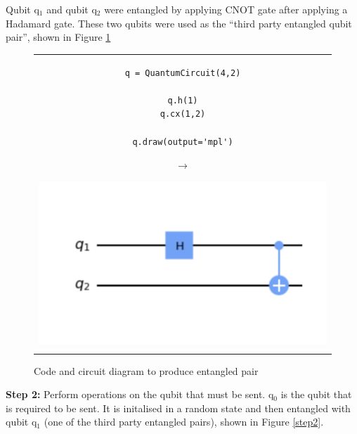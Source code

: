 Qubit q$_1$ and qubit q$_2$ were entangled by applying CNOT gate after applying a Hadamard gate. These two qubits were used as the ``third party entangled qubit pair'', shown in Figure \ref{step1}
\begin{figure}[H]
\centering
\begin{tabular}{c}
\begin{minipage}[c]{.45\linewidth}
\begin{verbatim}
q = QuantumCircuit(4,2)

q.h(1)
q.cx(1,2)

q.draw(output='mpl')
\end{verbatim}
\end{minipage}
\begin{minipage}[c]{.1\linewidth}
\centering
$\rightarrow$
\end{minipage}
\begin{minipage}[c]{.4\linewidth}
\centering
\includegraphics[width=\textwidth]{lab3/images/Step1.png}
\end{minipage}\\
\\ 
\end{tabular}
\caption{Code and circuit diagram to produce entangled pair}
\label{step1}
\end{figure}

\textbf{Step 2:} Perform operations on the qubit that must be sent.
q$_0$ is the qubit that is required to be sent. It is initalised in a random state and then entangled with qubit q$_1$ (one of the third party entangled pairs), shown in Figure \ref{step2}. 

